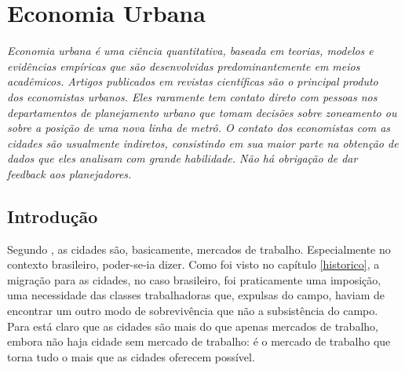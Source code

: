 \documentclass[
	12pt,				%
	oneside,			%
	a4paper,			%
	chapter=TITLE,		%
	section=TITLE,		%
	english,			%
	brazil				%
	]{abntex2}
\begin{document}
\hypertarget{economia-urbana}{%
\chapter{Economia Urbana}\label{economia-urbana}}
\begin{refsection}
\begin{epigrafe}
    \vspace*{\fill}
    \begin{flushright}
    \textit{Economia urbana é uma ciência quantitativa, baseada em teorias, modelos e\\
    evidências empíricas que são desenvolvidas predominantemente em meios\\
    acadêmicos. Artigos publicados em revistas científicas são o principal produto\\
    dos economistas urbanos. Eles raramente tem contato direto com pessoas nos\\
    departamentos de planejamento urbano que tomam decisões sobre zoneamento ou\\
    sobre a posição de uma nova linha de metrô. O contato dos economistas com as\\
    cidades são usualmente indiretos, consistindo em sua maior parte na obtenção de\\
    dados que eles analisam com grande habilidade. Não há obrigação de dar\\
    \emph{feedback} aos planejadores.\\
    \cite[p. 2]{bertaud}}
    \end{flushright}
\end{epigrafe}
\hypertarget{introduuxe7uxe3o-2}{%
\section{Introdução}\label{introduuxe7uxe3o-2}}

Segundo \textcite[p.~19]{bertaud}, as cidades são, basicamente, mercados de trabalho.
Especialmente no contexto brasileiro, poder-se-ia dizer. Como foi visto no
capítulo \ref{historico}, a migração para as cidades, no caso brasileiro, foi
praticamente uma imposição, uma necessidade das classes trabalhadoras que,
expulsas do campo, haviam de encontrar um outro modo de sobrevivência que não a
subsistência do campo. Para \textcite[p.~19]{bertaud} está claro que as cidades são mais
do que apenas mercados de trabalho, embora não haja cidade sem mercado de
trabalho: é o mercado de trabalho que torna tudo o mais que as cidades oferecem
possível.


\end{refsection}
\end{document}
